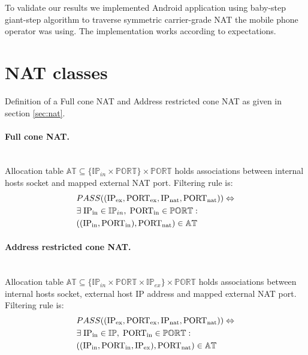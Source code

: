 \documentclass{llncs}
\begin{document}
To validate our results we implemented Android application using baby-step giant-step algorithm
to traverse symmetric carrier-grade NAT the mobile phone operator was using. The implementation
works according to expectations.

\appendix
\section{NAT classes}\label{sec:classes_appendix}
Definition of a Full cone NAT and Address restricted cone NAT as given in section \ref{sec:nat}.

\paragraph{Full cone NAT.} ~\\
Allocation table $\mathbb{AT} \subseteq \{ \mathbb{IP}_{in} \times \mathbb{PORT} \} \times \mathbb{PORT}$ holds associations between internal 
hosts socket and mapped external NAT port. 
Filtering rule is:
\begin{align*}
& PASS((\text{IP\textsubscript{ex}}, \text{PORT\textsubscript{ex}}, \text{IP\textsubscript{nat}}, \text{PORT\textsubscript{nat}} )) \Leftrightarrow \\
&  \exists \; \text{IP\textsubscript{in}} \in \mathbb{IP}_{in}, \; \text{PORT\textsubscript{in}} \in \mathbb{PORT}:\\
& ((\text{IP\textsubscript{in}}, \text{PORT\textsubscript{in}}), \text{PORT\textsubscript{nat}} ) \in \mathbb{AT}
\end{align*}
 
\paragraph{Address restricted cone NAT.} ~\\
Allocation table $\mathbb{AT} \subseteq \{\mathbb{IP}_{in} \times \mathbb{PORT} \times \mathbb{IP}_{ex}\} \times \mathbb{PORT}$ 
holds associations between internal hosts socket, external host IP address and mapped external NAT port. 
Filtering rule is:
\begin{align*}
& PASS((\text{IP\textsubscript{ex}}, \text{PORT\textsubscript{ex}}, \text{IP\textsubscript{nat}}, \text{PORT\textsubscript{nat}} )) \Leftrightarrow \\
&  \exists \; \text{IP\textsubscript{in}} \in \mathbb{IP}, \; \text{PORT\textsubscript{in}} \in \mathbb{PORT}:\\
& ((\text{IP\textsubscript{in}}, \text{PORT\textsubscript{in}}, \text{IP\textsubscript{ex}}), \text{PORT\textsubscript{nat}} ) \in \mathbb{AT}
\end{align*}

%



\end{document}
